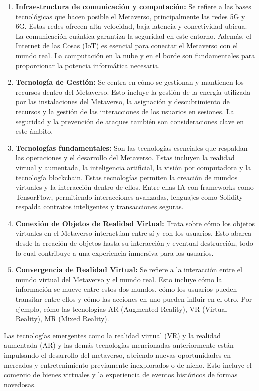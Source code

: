 \documentclass[a4paper,10pt]{article}
\begin{document}
	\begin{enumerate}
		\item \textbf{Infraestructura de comunicación y computación:} Se refiere a las bases tecnológicas que hacen posible el Metaverso, principalmente las redes 5G y 6G. Estas redes ofrecen alta velocidad, baja latencia y conectividad ubicua. La comunicación cuántica garantiza la seguridad en este entorno. Además, el Internet de las Cosas (IoT) es esencial para conectar el Metaverso con el mundo real. La computación en la nube y en el borde son fundamentales para proporcionar la potencia informática necesaria.
		\item \textbf{Tecnología de Gestión:} Se centra en cómo se gestionan y mantienen los recursos dentro del Metaverso. Esto incluye la gestión de la energía utilizada por las instalaciones del Metaverso, la asignación y descubrimiento de recursos y la gestión de las interacciones de los usuarios en sesiones. La seguridad y la prevención de ataques también son consideraciones clave en este ámbito.
		\item \textbf{Tecnologías fundamentales:} Son las tecnologías esenciales que respaldan las operaciones y el desarrollo del Metaverso. Estas incluyen la realidad virtual y aumentada, la inteligencia artificial, la visión por computadora y la tecnología blockchain. Estas tecnologías permiten la creación de mundos virtuales y la interacción dentro de ellos. Entre ellas IA con frameworks como TensorFlow, permitiendo interacciones avanzadas, lenguajes como Solidity respalda contratos inteligentes y transacciones seguras.
		\item \textbf{Conexión de Objetos de Realidad Virtual:} Trata sobre cómo los objetos virtuales en el Metaverso interactúan entre sí y con los usuarios. Esto abarca desde la creación de objetos hasta su interacción y eventual destrucción, todo lo cual contribuye a una experiencia inmersiva para los usuarios.
		\item \textbf{Convergencia de Realidad Virtual:} Se refiere a la interacción entre el mundo virtual del Metaverso y el mundo real. Esto incluye cómo la información se mueve entre estos dos mundos, cómo los usuarios pueden transitar entre ellos y cómo las acciones en uno pueden influir en el otro. Por ejemplo, cómo las tecnologías AR (Augmented Reality), VR (Virtual Reality), MR (Mixed Reality).
	\end{enumerate}
	Las tecnologías emergentes como la realidad virtual (VR) y la realidad aumentada (AR) y las demás tecnologías mencionadas anteriormente están impulsando el desarrollo del metaverso, abriendo nuevas oportunidades en mercados y entretenimiento previamente inexplorados o de nicho. Esto incluye el comercio de bienes virtuales y la experiencia de eventos históricos de formas novedosas. 
\end{document}
